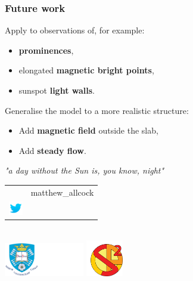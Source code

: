 \documentclass{beamer}
\begin{document}
\begin{frame}
\frametitle{Future work}
Apply to observations of, for example:
\begin{itemize}
\item \textbf{prominences}, 
\item elongated \textbf{magnetic bright points}, 
\item sunspot \textbf{light walls}.
\end{itemize}

Generalise the model to a more realistic structure:
\begin{itemize}
\item Add \textbf{magnetic field} outside the slab,
\item Add \textbf{steady flow}.
\end{itemize}
\vspace*{0.1in}
\end{frame}

\begin{frame}
\centering
\emph{"a day without the Sun is, you know, night"}
\\
\vspace*{0.4in}
\large
\begin{tabular}{lr}
& \vspace*{-0.23in} \hspace*{-0.15in} matthew\_allcock \\
\includegraphics[height=0.6cm]{media/twitter-icon.png} &
\end{tabular}
\\
\vspace*{0.4in}
\includegraphics[height=1.5cm]{media/logo-sheffield-2.png}
\hspace*{0.3in}
\includegraphics[height=1.6cm]{media/sp2rc_logo2.png}
\end{frame}
\end{document}

